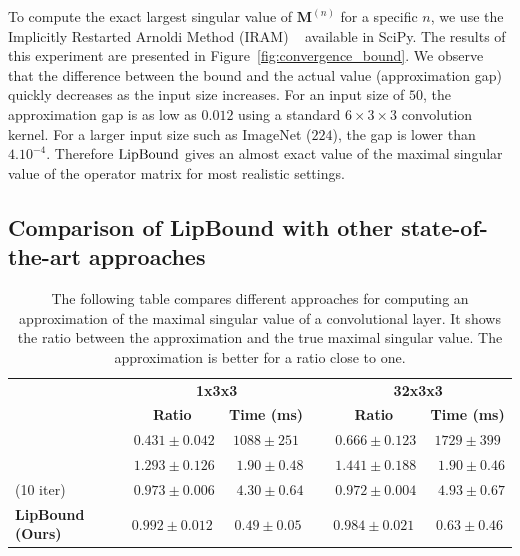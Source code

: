 To compute the exact largest singular value of $\mathbf{M}^{(n)}$ for a specific $n$, we use the Implicitly Restarted Arnoldi Method (IRAM) ~\cite{lehoucq1996deflation} available in SciPy.
The results of this experiment are presented in Figure~\ref{fig:convergence_bound}.
We observe that the difference between the bound and the actual value (approximation gap) quickly decreases as the input size increases.
For an input size of $50$, the approximation gap is as low as $0.012$ using a standard $6\times3\times3$ convolution kernel.
For a larger input size such as ImageNet ($224$), the gap is lower than $4.10^{-4}$.
Therefore $\operatorname{LipBound}$ gives an almost exact value of the maximal singular value of the operator matrix for most realistic settings.

\subsection{Comparison of LipBound with other state-of-the-art approaches} \label{subsec:comparaison_sota}


\begin{table}[t]
  \centering
  \caption{The following table compares different approaches for computing an approximation of the maximal singular value of a convolutional layer. It shows the ratio between the approximation and the true maximal singular value. The approximation is better for a ratio close to one.}
    \begin{tabular}{lrccrcc}
    \toprule
      &   & \multicolumn{2}{c}{\textbf{1x3x3}} &   & \multicolumn{2}{c}{\textbf{32x3x3}} \\
    \cmidrule{3-4}\cmidrule{6-7}  &   & \textbf{Ratio} & \textbf{Time (ms)} &   & \textbf{Ratio} & \textbf{Time (ms)} \\
    \midrule
    \citeauthor{sedghi2018the} &   & $\phantom{.}0.431\pm0.042$ & $1088\pm251$ &   & $\phantom{.}0.666\pm0.123$ & $1729\pm399$ \\
    \citeauthor{singla2019bounding} &   & $\phantom{.}1.293\pm0.126$ & $\phantom{..}1.90\pm0.48$ &   & $\phantom{.}1.441\pm0.188$ & $\phantom{..}1.90\pm0.46$ \\
    \citeauthor{farnia2018generalizable} (10 iter) &   & $\phantom{.}0.973\pm0.006$ & $\phantom{..}4.30\pm0.64$ &   & $\phantom{.}0.972\pm0.004$ & $\phantom{..}4.93\pm0.67$ \\
    \midrule
    \midrule
    \textbf{LipBound (Ours)} &   & $\mathbf{0.992}\pm0.012$ & $\phantom{.}\mathbf{0.49}\pm0.05$ &   & $\mathbf{0.984}\pm0.021$ & $\phantom{.}\mathbf{0.63}\pm0.46$ \\
    \bottomrule
    \end{tabular}%
  \label{tab:comparaison}%
\end{table}


